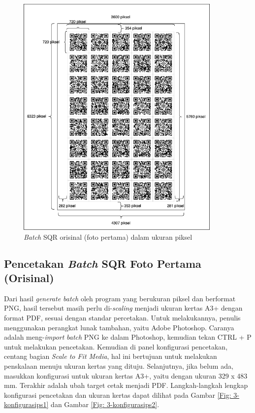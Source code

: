 \begin{figure}[!ht]
	\centering
	\includegraphics[width=10cm]{contents/chapter-3/3-batchqr.png}
	\caption{\emph{Batch} SQR orisinal (foto pertama) dalam ukuran piksel}
	\label{Fig: 3-batchqr}
\end{figure}

\subsection{Pencetakan \emph{Batch} SQR Foto Pertama (Orisinal)} \label{Pencetakan Batch SQR Foto Pertama (Orisinal)} Dari hasil \emph{generate batch} oleh program yang berukuran piksel dan
berformat PNG, hasil tersebut masih perlu di-\emph{scaling} menjadi ukuran kertas A3+ dengan format PDF, sesuai dengan standar percetakan. Untuk melakukannya,
penulis menggunakan perangkat lunak tambahan, yaitu Adobe Photoshop. Caranya adalah meng-\emph{import} \emph{batch} PNG ke dalam Photoshop, kemudian tekan CTRL
+ P untuk melakukan pencetakan. Kemudian di panel konfigurasi pencetakan, centang bagian \emph{Scale to Fit Media}, hal ini bertujuan untuk melakukan
penskalaan menuju ukuran kertas yang dituju. Selanjutnya, jika belum ada, masukkan konfigurasi untuk ukuran kertas A3+, yaitu dengan ukuran 329 x 483 mm.
Terakhir adalah ubah target cetak menjadi PDF. Langkah-langkah lengkap konfigurasi pencetakan dan ukuran kertas dapat dilihat pada Gambar \ref{Fig:
	3-konfigurasips1} dan Gambar \ref{Fig: 3-konfigurasips2}.

